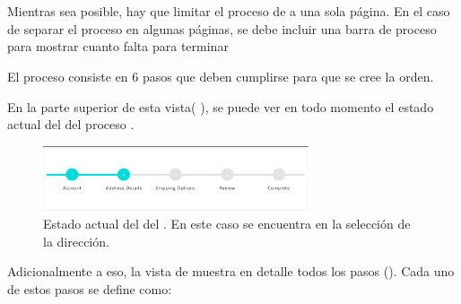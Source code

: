 \section{\checkoutEF}\label{chapter:solucionimplementada:section:checkout}

	Mientras sea posible, hay que limitar el proceso de \checkoutEF a una sola página. En el caso de separar el proceso en algunas páginas, se debe incluir una barra de proceso para mostrar cuanto falta para terminar \cite{online_official_imediaconnection_best_practices_shopping_cart}

	El proceso consiste en 6 pasos que deben cumplirse para que se cree la orden.

	En la parte superior de esta vista( ), se puede ver en todo momento el estado actual del \workflowCPT del proceso \checkoutEF.

	\begin{figure}[H]
		\centering
		\includegraphics[width=0.7\textwidth]{figuras/shipping/global_status.png}
		\caption{Estado actual del \workflowCPT del \shippingEF. En este caso se encuentra en la selección de la dirección.}
		\label{figure:checkout:global_status}
	\end{figure}

	Adicionalmente a eso, la vista de \shippingEF muestra en detalle todos los pasos (). Cada uno de estos pasos se define como:

